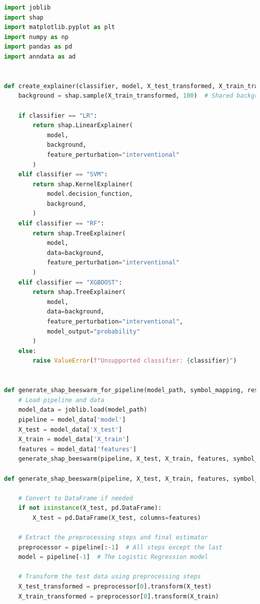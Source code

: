 \documentclass[12pt]{report}
\begin{document}
    \begin{lstlisting}[language=Python,caption={shap\_analysis\_stratified.py: Ανάλυση SHAP όλων των αποτελεσμάτων κατηγοριοποίησης από τους αλγορίθμους ML}, label=lst:shapanalysisstratified]
import joblib
import shap
import matplotlib.pyplot as plt
import numpy as np
import pandas as pd
import anndata as ad


def create_explainer(classifier, model, X_test_transformed, X_train_transformed):
    background = shap.sample(X_train_transformed, 100)  # Shared background

    if classifier == "LR":
        return shap.LinearExplainer(
            model,
            background,
            feature_perturbation="interventional"
        )
    elif classifier == "SVM":
        return shap.KernelExplainer(
            model.decision_function,
            background,
        )
    elif classifier == "RF":
        return shap.TreeExplainer(
            model,
            data=background,
            feature_perturbation="interventional"
        )
    elif classifier == "XGBOOST":
        return shap.TreeExplainer(
            model,
            data=background,
            feature_perturbation="interventional",
            model_output="probability"
        )
    else:
        raise ValueError(f"Unsupported classifier: {classifier}")


def generate_shap_beeswarm_for_pipeline(model_path, symbol_mapping, results_file_path, stratum, classifier, top_n=30):
    # Load pipeline and data
    model_data = joblib.load(model_path)
    pipeline = model_data['model']
    X_test = model_data['X_test']
    X_train = model_data['X_train']
    features = model_data['features']
    generate_shap_beeswarm(pipeline, X_test, X_train, features, symbol_mapping, results_file_path, stratum, classifier, top_n)

def generate_shap_beeswarm(pipeline, X_test, X_train, features, symbol_mapping, results_file_path, stratum, classifier, top_n=30):

    # Convert to DataFrame if needed
    if not isinstance(X_test, pd.DataFrame):
        X_test = pd.DataFrame(X_test, columns=features)

    # Extract the preprocessing steps and final estimator
    preprocessor = pipeline[:-1]  # All steps except the last
    model = pipeline[-1]  # The Logistic Regression model

    # Transform the test data using preprocessing steps
    X_test_transformed = preprocessor[0].transform(X_test)
    X_train_transformed = preprocessor[0].transform(X_train)


\end{lstlisting}
\end{document}
